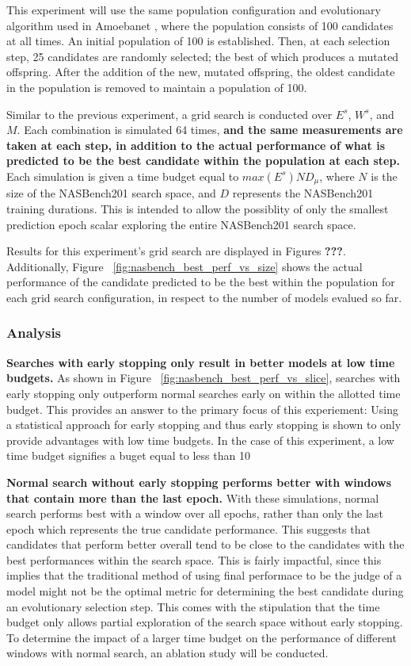 \documentclass[twocolumn]{article}
\begin{document}
This experiment will use the same population configuration and evolutionary algorithm used in Amoebanet \cite{amoebanet}, where the population consists of 100 candidates at all times.
An initial population of 100 is established.
Then, at each selection step, 25 candidates are randomly selected; the best of which produces a mutated offspring.
After the addition of the new, mutated offspring, the oldest candidate in the population is removed to maintain a population of 100.

Similar to the previous experiment, a grid search is conducted over $E^s$, $W^s$, and $M$.
Each combination is simulated 64 times, \textbf{and the same measurements are taken at each step, in addition to the actual performance of what is predicted to be the
best candidate within the population at each step.}
Each simulation is given a time budget equal to $max(E^{s})ND_{\mu}$, where $N$ is the size of the NASBench201 search space, and $D$ represents the NASBench201 training durations.
This is intended to allow the possiblity of only the smallest prediction epoch scalar exploring the entire NASBench201 search space.

Results for this experiment's grid search are displayed in Figures \textbf{???}. 
Additionally, Figure ~\ref{fig:nasbench_best_perf_vs_size} shows the actual performance of the candidate predicted to be the best within the population for each grid search configuration,
in respect to the number of models evalued so far.

\subsubsection{Analysis}

\textbf{Searches with early stopping only result in better models at low time budgets.}
As shown in Figure ~\ref{fig:nasbench_best_perf_vs_slice}, searches with early stopping only outperform normal searches early on within the allotted time budget.
This provides an answer to the primary focus of this experiement: Using a statistical approach for early stopping and thus early stopping
is shown to only provide advantages with low time budgets.
In the case of this experiment, a low time budget signifies a buget equal to less than 10%

\textbf{Normal search without early stopping performs better with windows that contain more than the last epoch.}
With these simulations, normal search performs best with a window over all epochs, rather than only the last epoch which represents the true candidate performance.
This suggests that candidates that perform better overall tend to be close to the candidates with the best performances within the search space.
This is fairly impactful, since this implies that the traditional method of using final performace to be the judge of a model might not be the optimal
metric for determining the best candidate during an evolutionary selection step.
This comes with the stipulation that the time budget only allows partial exploration of the search space without early stopping.
To determine the impact of a larger time budget on the performance of different windows with normal search, an ablation study will be conducted.
\end{document}
